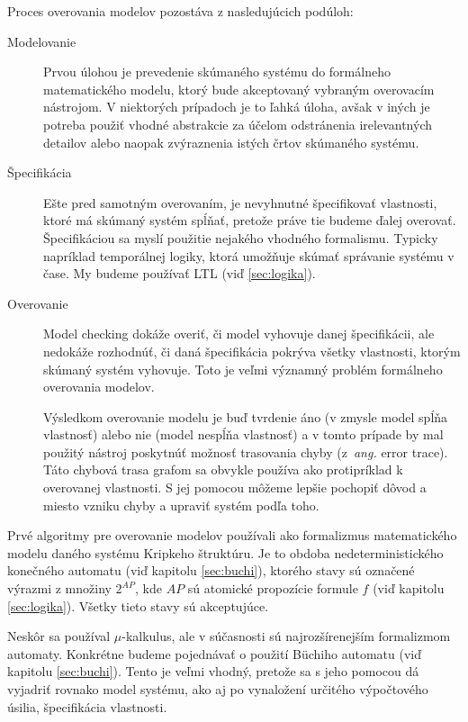 \documentclass[11pt,final,oneside]{fithesis}
\begin{document}
Proces overovania modelov pozost\'ava z nasleduj\'ucich pod\'uloh:
\begin{description}
\item[Modelovanie] 
Prvou \'ulohou je prevedenie sk\'uman\'eho syst\'emu do form\'alneho matematick\'eho modelu, ktor\'y bude akceptovan\'y vybran\'ym overovac\'im n\'astrojom.
V niektor\'ych pr\'ipadoch je to \v lahk\'a \'uloha, av\v sak v in\'ych je potreba pou\v zi\v t vhodn\'e abstrakcie za \'u\v celom odstr\'anenia 
irelevantn\'ych detailov alebo naopak zv\'yraznenia ist\'ych \v crtov sk\'uman\'eho syst\'emu.
\item[\v Specifik\'acia]
E\v ste pred samotn\'ym overovan\'im, je nevyhnutn\'e \v specifikova\v t vlastnosti, ktor\'e m\'a sk\'uman\'y syst\'em sp\'l\v na\v t, preto\v ze pr\'ave tie
budeme \v dalej overova\v t. \v Specifik\'aciou sa mysl\'i pou\v zitie nejak\'eho vhodn\'eho formalismu. Typicky napr\'iklad tempor\'alnej logiky, ktor\'a
umo\v z\v nuje sk\'uma\v t spr\'avanie syst\'emu v \v case. My budeme pou\v z\'iva\v t LTL (vi\v d \ref{sec:logika}).
\item[Overovanie]
Model checking dok\'a\v ze overi\v t, \v ci model vyhovuje danej \v specifik\'acii, ale nedok\'a\v ze rozhodn\'u\v t, \v ci dan\'a \v specifik\'acia 
pokr\'yva v\v setky vlastnosti, ktor\'ym sk\'uman\'y syst\'em vyhovuje. Toto je ve\v lmi v\'yznamn\'y probl\'em form\'alneho overovania modelov.

V\'ysledkom overovanie modelu je bu\v d tvrdenie \'ano (v zmysle model sp\'l\v na vlastnos\v t) alebo nie (model nesp\'l\v na vlastnos\v t) a v tomto pr\'ipade
by mal pou\v zit\'y n\'astroj poskytn\'u\v t mo\v znos\v t trasovania chyby (z~\textit{ang.} error trace). T\'ato chybov\'a trasa grafom sa obvykle 
pou\v z\'iva ako protipr\'iklad k overovanej vlastnosti. S jej pomocou m\^ o\v zeme lep\v sie pochopi\v t d\^ ovod a miesto vzniku chyby a upravi\v t syst\'em 
pod\v la toho. \cite{Clarke:MC:Process}
\end{description}

Prv\'e algoritmy pre overovanie modelov pou\v z\'ivali ako formalizmus matematick\'eho modelu dan\'eho syst\'emu Kripkeho \v strukt\'uru. Je to obdoba 
nedeterministick\'eho kone\v cn\'eho automatu (vi\v d kapitolu \ref{sec:buchi}), ktor\'eho stavy s\'u ozna\v cen\'e v\'yrazmi z mno\v ziny $2^{AP}$, kde 
$AP$ s\'u atomick\'e propoz\'icie formule $f$ (vi\v d kapitolu \ref{sec:logika}). V\v setky tieto stavy s\'u akceptuj\'uce.

Nesk\^ or sa pou\v z\'ival $\mu$-kalkulus, ale v s\'u\v casnosti s\'u najroz\v s\'irenej\v s\'im formalizmom automaty. Konkr\'etne budeme pojedn\'ava\v t 
o pou\v zit\'i B\"uchiho automatu (vi\v d kapitolu \ref{sec:buchi}). Tento je ve\v lmi vhodn\'y, preto\v ze sa s jeho pomocou d\'a vyjadri\v t rovnako
model syst\'emu, ako aj po vynalo\v zen\'i ur\v cit\'eho v\'ypo\v ctov\'eho \'usilia, \v specifik\'acia vlastnosti.
\end{document}
